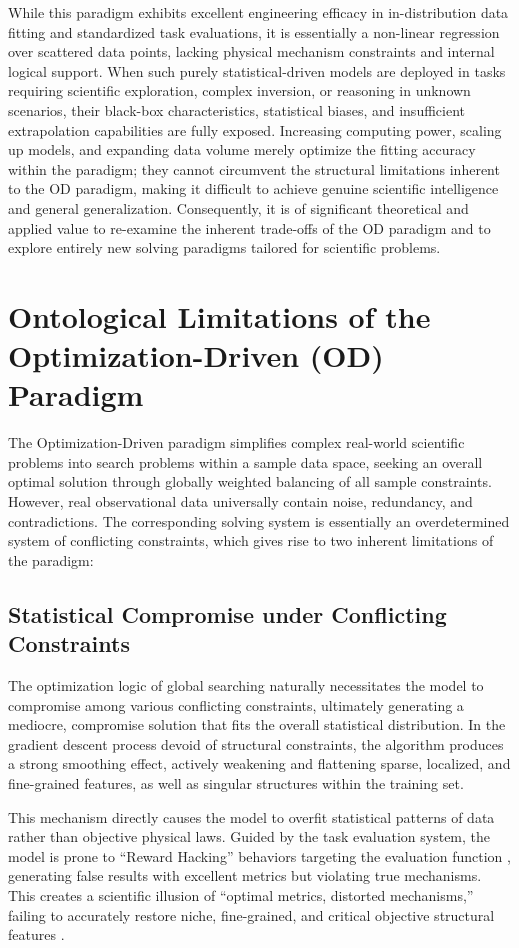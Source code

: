 \documentclass[11pt,a4paper]{article}
\begin{document}
While this paradigm exhibits excellent engineering efficacy in in-distribution data fitting and standardized task evaluations, it is essentially a non-linear regression over scattered data points, lacking physical mechanism constraints and internal logical support. When such purely statistical-driven models are deployed in tasks requiring scientific exploration, complex inversion, or reasoning in unknown scenarios, their black-box characteristics, statistical biases, and insufficient extrapolation capabilities are fully exposed. Increasing computing power, scaling up models, and expanding data volume merely optimize the fitting accuracy within the paradigm; they cannot circumvent the structural limitations inherent to the OD paradigm, making it difficult to achieve genuine scientific intelligence and general generalization. Consequently, it is of significant theoretical and applied value to re-examine the inherent trade-offs of the OD paradigm and to explore entirely new solving paradigms tailored for scientific problems.

\section{Ontological Limitations of the Optimization-Driven (OD) Paradigm}
The Optimization-Driven paradigm simplifies complex real-world scientific problems into search problems within a sample data space, seeking an overall optimal solution through globally weighted balancing of all sample constraints. However, real observational data universally contain noise, redundancy, and contradictions. The corresponding solving system is essentially an overdetermined system of conflicting constraints, which gives rise to two inherent limitations of the paradigm:

\subsection{Statistical Compromise under Conflicting Constraints}
The optimization logic of global searching naturally necessitates the model to compromise among various conflicting constraints, ultimately generating a mediocre, compromise solution that fits the overall statistical distribution. In the gradient descent process devoid of structural constraints, the algorithm produces a strong smoothing effect, actively weakening and flattening sparse, localized, and fine-grained features, as well as singular structures within the training set.

This mechanism directly causes the model to overfit statistical patterns of data rather than objective physical laws. Guided by the task evaluation system, the model is prone to ``Reward Hacking'' behaviors targeting the evaluation function \cite{amodei2016}, generating false results with excellent metrics but violating true mechanisms. This creates a scientific illusion of ``optimal metrics, distorted mechanisms,'' failing to accurately restore niche, fine-grained, and critical objective structural features \cite{hochberg2026}.
\end{document}
